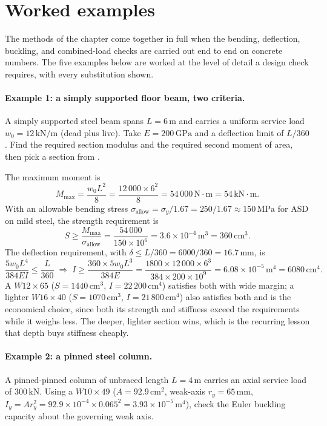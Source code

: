 \section{Worked examples}

The methods of the chapter come together in full when the bending,
deflection, buckling, and combined-load checks are carried out
end to end on concrete numbers. The five examples below are worked at
the level of detail a design check requires, with every substitution
shown.

\paragraph{Example 1: a simply supported floor beam, two criteria.}
A simply supported steel beam spans $L=6\,\si{\meter}$ and carries a
uniform service load $w_0 = 12\,\text{kN}/\text{m}$ (dead plus live).
Take $E = 200\,\text{GPa}$ and a deflection limit of $L/360$. Find the
required section modulus and the required second moment of area, then
pick a section from .

The maximum moment is
\[
M_{\max} = \frac{w_0 L^2}{8} = \frac{12\,000 \times 6^2}{8}
= 54\,000\,\text{N}\cdot\text{m} = 54\,\text{kN}\cdot\text{m}.
\]
With an allowable bending stress $\sigma_{\text{allow}} =
\sigma_y/1.67 = 250/1.67 \approx 150\,\text{MPa}$ for ASD on mild
steel, the strength requirement is
\[
S \geq \frac{M_{\max}}{\sigma_{\text{allow}}} = \frac{54\,000}{150
\times 10^6} = 3.6 \times 10^{-4}\,\si{\meter\cubed} = 360\,\text{cm}^3.
\]
The deflection requirement, with $\delta \leq L/360 = 6000/360 =
16.7\,\si{\milli\meter}$, is
\[
\frac{5 w_0 L^4}{384 EI} \leq \frac{L}{360}
\;\Rightarrow\;
I \geq \frac{360 \times 5 w_0 L^3}{384 E}
= \frac{1800 \times 12\,000 \times 6^3}{384 \times 200 \times 10^9}
= 6.08 \times 10^{-5}\,\si{\meter\tothe{4}} = 6080\,\text{cm}^4.
\]
A $W12\times 65$ ($S = 1440\,\text{cm}^3$, $I = 22\,200\,\text{cm}^4$)
satisfies both with wide margin; a lighter $W16\times 40$
($S=1070\,\text{cm}^3$, $I=21\,800\,\text{cm}^4$) also satisfies both
and is the economical choice, since both its strength and stiffness
exceed the requirements while it weighs less. The deeper, lighter
section wins, which is the recurring lesson that depth buys stiffness
cheaply.

\paragraph{Example 2: a pinned steel column.}
A pinned-pinned column of unbraced length $L = 4\,\si{\meter}$ carries
an axial service load of $300\,\text{kN}$. Using a $W10\times 49$
($A = 92.9\,\text{cm}^2$, weak-axis $r_y = 65\,\si{\milli\meter}$,
$I_y = A r_y^2 = 92.9\times 10^{-4} \times 0.065^2 = 3.93\times
10^{-5}\,\si{\meter\tothe{4}}$), check the Euler buckling capacity
about the governing weak axis.

